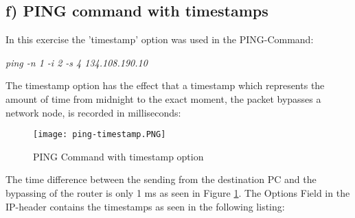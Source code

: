 \subsection{f) PING command with timestamps}
In this exercise the 'timestamp' option was used in the PING-Command:
\begin{center}
	\textit{ping -n 1 -i 2 -s 4 134.108.190.10}
\end{center}
The timestamp option has the effect that a timestamp which represents the amount of time from midnight to the exact moment, the packet bypasses a network node, is recorded in milliseconds:
\begin{figure}[H]
	\centering
	\texttt{[image: ping-timestamp.PNG]}
	\caption{PING Command with timestamp option}
	\label{ping-timestamp}
\end{figure} 
The time difference between the sending from the destination PC and the bypassing of the router is only 1 ms as seen in Figure \ref{ping-timestamp}. The Options Field in the IP-header contains the timestamps as seen in the following listing:
